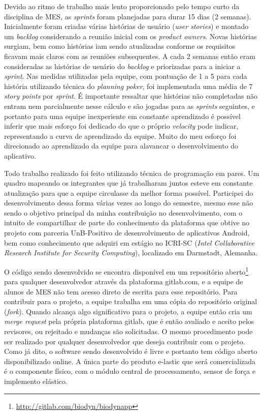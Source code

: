 Devido ao ritmo de trabalho mais lento proporcionado pelo tempo curto da disciplina de MES, as \textit{sprints} foram planejadas para durar 15 dias (2 semanas). Inicialmente foram criadas várias histórias de usuário (\textit{user stories}) e montado um \textit{backlog} considerando a reunião inicial com os \textit{product owners}. Novas histórias surgiam, bem como histórias iam sendo atualizadas conforme os requisitos ficavam mais claros com as reuniões subsequentes. A cada 2 semanas então eram consideradas as histórias de usuário do \textit{backlog} e priorizadas para a iniciar a \textit{sprint}. Nas medidas utilizadas pela equipe, com pontuação de 1 a 5 para cada história utilizando técnica do \textit{planning poker}, foi implementada uma média de 7 \textit{story points} por \textit{sprint}. É importante ressaltar que histórias não completadas não entram nem parcialmente nesse cálculo e são jogadas para as \textit{sprints} seguintes, e portanto para uma equipe inexperiente em constante aprendizado é possível inferir que mais esforço foi dedicado do que o próprio \textit{velocity} pode indicar, representando a curva de aprendizado da equipe. Muito do meu esforço foi direcionado ao aprendizado da equipe para alavancar o desenvolvimento do aplicativo.

Todo trabalho realizado foi feito utilizando técnica de programação em pares. Um quadro mapeando os integrantes que já trabalharam juntos esteve em constante atualização para que a equipe circulasse da melhor forma possível. Participei do desenvolvimento dessa forma várias vezes ao longo do semestre, mesmo esse não sendo o objetivo principal da minha contribuição no desenvolvimento, com o intuito de compartilhar de parte do conhecimento da plataforma que obtive no projeto com parceria UnB-Positivo de desenvolvimento de aplicativos Android, bem como conhecimento que adquiri em estágio no ICRI-SC (\textit{Intel Collaborative Research Institute for Security Computing}), localizado em Darmstadt, Alemanha.

O código sendo desenvolvido se encontra disponível em um repositório aberto\footnote{\url{http://gitlab.com/biodyn/biodynapp}} para qualquer desenvolvedor através da plataforma gitlab.com, e a equipe de alunos de MES não tem acesso direto de escrita para esse repositório. Para contribuir para o projeto, a equipe trabalha em uma cópia do repositório original (\textit{fork}). Quando alcança algo significativo para o projeto, a equipe então cria um \textit{merge request} pela própria plataforma gitlab, que é então avaliado e aceito pelos revisores, ou rejeitado e mudanças são solicitadas. O mesmo procedimento pode ser realizado por qualquer desenvolvedor que deseja contribuir com o projeto. Como já dito, o software sendo desenvolvido é livre e portanto tem código aberto disponibilizado online. A única parte do produto e-lastic que será comercializada é o componente físico, com o módulo central de processamento, sensor de força e implemento elástico.

